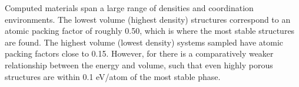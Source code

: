 Computed materials span a large range of densities and coordination environments.
%
%
The lowest volume (highest density) structures correspond to an atomic packing factor of roughly \num{0.50}, which is where the most stable structures are found.
%
The highest volume (lowest density) systems sampled have atomic packing factors close to \num{0.15}.
%
However, for \IrOthree there is a comparatively weaker relationship between the energy and volume, such that even highly porous structures are within \num{0.1} eV/atom of the most stable phase.
%
%
%
%


